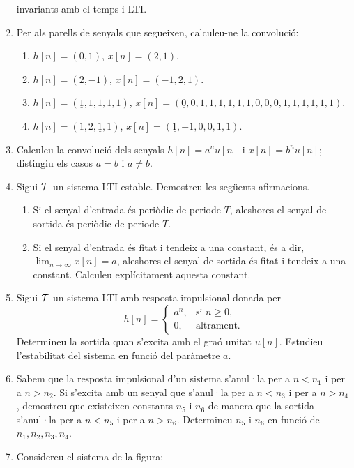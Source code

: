 \documentclass[a4paper,12pt]{article}
\newcommand\cT{{\cal T}}
\begin{document}
\begin{enumerate}
  invariants amb el temps i LTI.
\item Per als parells de senyals que segueixen, calculeu-ne la
  convolució:
  \begin{enumerate}
  \item $h[n]=(\underline{0},1)$, $x[n]=(\underline{2},1)$.
  \item $h[n]=(\underline{2},-1)$, $x[n]=(\underline{-1},2,1)$.
  \item $h[n]=(\underline{1},1,1,1,1)$,
    $x[n]=(\underline{0},0,1,1,1,1,1,1,0,0,0,1,1,1,1,1,1)$.
  \item $h[n]=(1,2,\underline{1},1)$, $x[n]=(\underline{1},-1,0,0,1,1)$.
  \end{enumerate}
\item Calculeu la convolució dels senyals $h[n]=a^n u[n]$ i $x[n]=b^n
  u[n]$; distingiu els casos $a=b$ i $a\neq b$.
\item Sigui $\cT$ un sistema LTI estable. Demostreu les següents
  afirmacions. 
  \begin{enumerate}
  \item Si el senyal d'entrada és periòdic de periode $T$, aleshores
    el senyal de sortida és periòdic de periode $T$.
  \item Si el senyal d'entrada és fitat i tendeix a una constant, és a
    dir, $\lim_{n\to\infty}x[n]=a$, aleshores el senyal de sortida és
    fitat i tendeix a una constant. Calculeu explícitament aquesta
    constant. 
  \end{enumerate}
\item Sigui $\cT$ un sistema LTI amb resposta impulsional donada per
  $$h[n]=\begin{cases}
    a^n, & \text{si $n\ge 0$,}\\
    0,&\text{altrament.} 
  \end{cases}
  $$
  Determineu la sortida quan s'excita amb el graó unitat
  $u[n]$. Estudieu l'estabilitat del sistema en funció del paràmetre
  $a$.
\item Sabem que la resposta impulsional d'un sistema s'anul·la per a
  $n<n_1$ i per a $n>n_2$. Si s'excita amb un senyal que s'anul·la per
  a $n<n_3$ i per a $n>n_4$, demostreu que existeixen constants $n_5$
  i $n_6$ de manera que la sortida s'anul·la per a $n<n_5$ i per a
  $n>n_6$. Determineu $n_5$ i $n_6$ en funció de $n_1,n_2,n_3,n_4$.
\item Considereu el sistema de la figura:




\end{enumerate}
\end{document}
